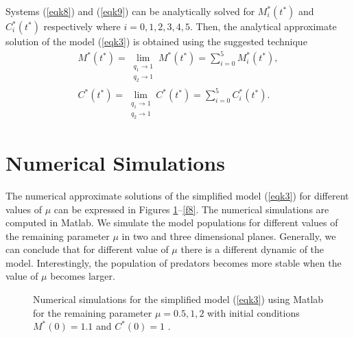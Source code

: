\documentclass[a4paper,12pt]{article}
\begin{document}
Systems (\ref{eqk8}) and (\ref{eqk9}) can be analytically solved for $M^{*}_{i}(t^{*})$ and $C^{*}_{i}(t^{*})$ respectively where $i=0,1,2,3,4,5$. Then, the analytical approximate solution of the model (\ref{eqk3}) is obtained using the suggested technique
 \begin{equation}  
\begin{array}{llll}
M^{*}(t^{*})=\lim\limits_{\substack{q_{1} \to 1 \\ q_{2} \to 1}}M^{*}(t^{*})= \sum\limits_{i=0}^{5}M^{*}_{i}(t^{*}),\\
C^{*}(t^{*})=\lim\limits_{\substack{q_{1} \to 1 \\ q_{2} \to 1}}C^{*}(t^{*})= \sum\limits_{i=0}^{5}C^{*}_{i}(t^{*}).
\end{array}\label{eqk10}
\end{equation}
\section{Numerical Simulations}
 The numerical approximate solutions of the simplified model (\ref{eqk3}) for different values of $\mu$ can be expressed in Figures \ref{f2}--\ref{f8}. The numerical simulations are computed in Matlab. We simulate the model populations for different values of the remaining parameter $\mu$ in two and three dimensional planes. Generally, we can conclude that for different value of $\mu$ there is a different dynamic of the model. Interestingly, the population of predators becomes more stable when the value of $\mu$ becomes larger.
 
\begin{figure}[ht]         
      \begin{center}    
    \end{center}       
\caption {Numerical simulations for the simplified model (\ref{eqk3}) using Matlab for the remaining parameter $\mu = 0.5 ,1, 2$  with initial conditions $M^{*}(0)=1.1$ and $C^{*}(0)=1$ .}  
   \label{f2}  
\end{figure} 
\end{document}
